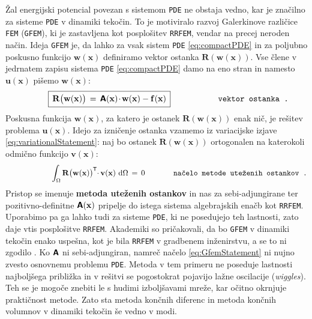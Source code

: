 Žal energijski potencial povezan s sistemom \texttt{PDE} ne obstaja vedno, kar je značilno za sisteme \texttt{PDE} v dinamiki tekočin. To je motiviralo razvoj Galerkinove različice \texttt{FEM} (\texttt{GFEM}), ki je zastavljena kot posplošitev \texttt{RRFEM}, vendar na precej neroden način. Ideja \texttt{GFEM} je, da lahko za vsak sistem \texttt{PDE} \eqref{eq:compactPDE} in za poljubno poskusno funkcijo $\mathbf{w(x)}$ definiramo vektor ostanka $\mathbf{R(w(x))}$. Vse člene v jedrnatem zapisu sistema \texttt{PDE} \eqref{eq:compactPDE} damo na eno stran in namesto $\mathbf{u(x)}$ pišemo $\mathbf{w(x)}$:
\begin{equation}
	\hspace{10mm} \boxed{\, \vphantom{\big(}
		\mathbf{R\big(w(x)\big)} \, = \, \mathbsf{A}(\mathbf{x}) \mkern-2.5mu \cdot \mkern-2mu \mathbf{w(x)} - \mathbf{f(x)} \,
	}\hspace{20mm} \texttt{vektor ostanka .}
	\label{eq:residual}
\end{equation}
Poskusna funkcija $\mathbf{w(x)}$, za katero je ostanek $\mathbf{R(w(x))}$ enak nič, je rešitev problema $\mathbf{u(x)}$. Idejo za izničenje ostanka vzamemo iz variacijske izjave \eqref{eq:variationalStatement}: naj bo ostanek $\mathbf{R(w(x))}$ ortogonalen na katerokoli odmično funkcijo $\mathbf{v(x)}$:
\begin{equation}
	\hspace{21mm} \int_{\Omega} \mathbf{R\big(w(x)\big)}^\mathsf{\mkern-1mu T} \mkern-4.5mu \cdot \mkern-1mu \mathbf{v(x)} \ \ud \Omega \, = \, 0 \hspace{13mm} \texttt{načelo metode uteženih ostankov .}
	\label{eq:GfemStatement}
\end{equation}
Pristop se imenuje \textbf{metoda uteženih ostankov} in nas za sebi-adjungirane ter pozitivno-definitne $\bm{\mathsf{A}}\mathbf{(x)}$ pripelje do istega sistema algebrajskih enačb kot \texttt{RRFEM}. Uporabimo pa ga lahko tudi za sisteme \texttt{PDE}, ki ne posedujejo teh lastnosti, zato daje vtis posplošitve \texttt{RRFEM}. Akademiki so pričakovali, da bo \texttt{GFEM} v dinamiki tekočin enako uspešna, kot je bila \texttt{RRFEM} v gradbenem inženirstvu, a se to ni zgodilo \cite{JiangB-LSFEM}. Ko $\bm{\mathsf{A}}$ ni sebi-adjungiran, namreč načelo \eqref{eq:GfemStatement} ni nujno zvesto osnovnemu problemu \texttt{PDE}. Metoda v tem primeru ne poseduje lastnosti najboljšega približka in v rešitvi se pogostokrat pojavijo lažne oscilacije (\emph{wiggles}). Teh se je mogoče znebiti le s hudimi izboljšavami mreže, kar očitno okrnjuje praktičnost metode. Zato sta metoda končnih diferenc in metoda končnih volumnov v dinamiki tekočin še vedno v modi.

